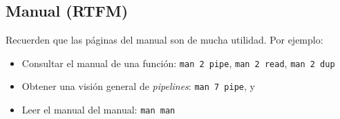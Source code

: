 \documentclass[11pt]{article}
\begin{document}
\subsection{Manual (RTFM)}

Recuerden que las páginas del manual son de mucha utilidad. Por ejemplo: 

\begin{itemize}
	\item Consultar el manual de una función: \texttt{man 2 pipe}, \texttt{man 2 read}, \texttt{man 2 dup}
	\item Obtener una visión general de \textit{pipelines}: \texttt{man 7 pipe}, y 
	\item Leer el manual del manual: \texttt{man man}
\end{itemize}
\end{document}
